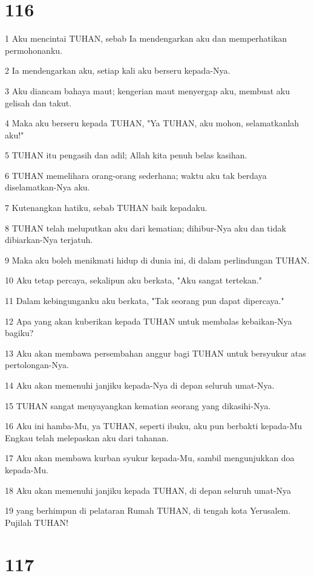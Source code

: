 \chapter{116}

\par 1 Aku mencintai TUHAN, sebab Ia mendengarkan aku dan memperhatikan permohonanku.
\par 2 Ia mendengarkan aku, setiap kali aku berseru kepada-Nya.
\par 3 Aku diancam bahaya maut; kengerian maut menyergap aku, membuat aku gelisah dan takut.
\par 4 Maka aku berseru kepada TUHAN, "Ya TUHAN, aku mohon, selamatkanlah aku!"
\par 5 TUHAN itu pengasih dan adil; Allah kita penuh belas kasihan.
\par 6 TUHAN memelihara orang-orang sederhana; waktu aku tak berdaya diselamatkan-Nya aku.
\par 7 Kutenangkan hatiku, sebab TUHAN baik kepadaku.
\par 8 TUHAN telah meluputkan aku dari kematian; dihibur-Nya aku dan tidak dibiarkan-Nya terjatuh.
\par 9 Maka aku boleh menikmati hidup di dunia ini, di dalam perlindungan TUHAN.
\par 10 Aku tetap percaya, sekalipun aku berkata, "Aku sangat tertekan."
\par 11 Dalam kebingunganku aku berkata, "Tak seorang pun dapat dipercaya."
\par 12 Apa yang akan kuberikan kepada TUHAN untuk membalas kebaikan-Nya bagiku?
\par 13 Aku akan membawa persembahan anggur bagi TUHAN untuk bersyukur atas pertolongan-Nya.
\par 14 Aku akan memenuhi janjiku kepada-Nya di depan seluruh umat-Nya.
\par 15 TUHAN sangat menyayangkan kematian seorang yang dikasihi-Nya.
\par 16 Aku ini hamba-Mu, ya TUHAN, seperti ibuku, aku pun berbakti kepada-Mu Engkau telah melepaskan aku dari tahanan.
\par 17 Aku akan membawa kurban syukur kepada-Mu, sambil mengunjukkan doa kepada-Mu.
\par 18 Aku akan memenuhi janjiku kepada TUHAN, di depan seluruh umat-Nya
\par 19 yang berhimpun di pelataran Rumah TUHAN, di tengah kota Yerusalem. Pujilah TUHAN!

\chapter{117}

